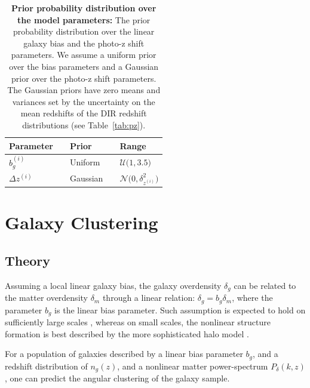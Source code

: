 \documentclass[fleqn,usenatbib,useAMS]{mnras}
\begin{document}
\begin{table}
\begin{center}
	\caption{{\bf Prior probability distribution over the model parameters:} 
    The prior probability distribution over the linear galaxy bias and the photo-z shift parameters. We assume a uniform prior over the bias parameters and a Gaussian prior over the photo-z shift parameters. The Gaussian priors have zero means and variances set by the uncertainty on the mean redshifts of the DIR redshift distributions (see Table~\ref{tab:pz}).}
	\label{tab:prior}
	\begin{tabular}{@{}lllll} 
	\\	\hline
		Parameter        & & Prior       & & Range \\
		\hline
		$b_{g}^{(i)}$    & & Uniform     & & $\mathcal{U}\Big(1,3.5\Big)$  \\
		$\Delta z^{(i)}$ & & Gaussian    & & $\mathcal{N}\Big(0, \delta^{2}_{z^{(i)}}\Big)$  \\
		\hline
	\end{tabular}
\end{center}
\end{table}



\section{Galaxy Clustering}\label{sec:clustering}

\subsection{Theory}

Assuming a local linear galaxy bias, the galaxy overdensity $\delta_g$ can be related to the matter overdensity $\delta_m$ through a linear relation: $\delta_g = b_g \delta_m$, where the parameter $b_g$ is the linear bias parameter. Such assumption is expected to hold on sufficiently large scales \citep[e.g.][]{dvornik2018}, whereas on small scales, the nonlinear structure formation is best described by the more sophisticated halo model \citep[e.g. ][]{hand2017,vakili_hahn}.

For a population of galaxies described by a linear bias parameter $b_g$, and a redshift distribution of $n_g(z)$, and a nonlinear matter power-spectrum $P_{\delta}(k,z)$, one can predict the angular clustering of the galaxy sample.
\end{document}

